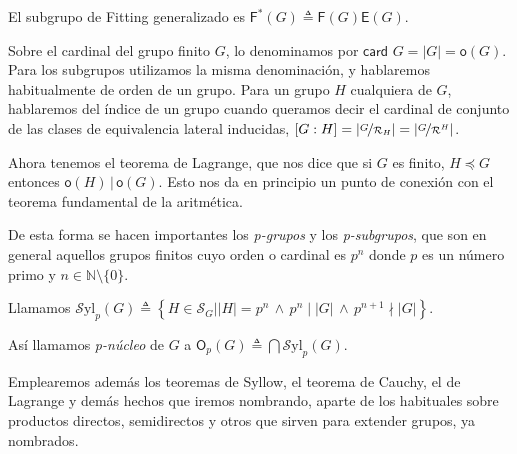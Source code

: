 \documentclass[12pt,a4paper,fleqn,spanish,final,openright]{extbook}
\theoremstyle{definition}
\theoremstyle{remark}
\theoremstyle{proof}
\begin{document}
El subgrupo de Fitting generalizado es $\mathsf{F}^{*}(G) \triangleq \mathsf{F}(G) \mathsf{E}(G)$.

Sobre el cardinal del grupo finito $G$, lo denominamos por $\textsf{card }G = \left| G \right| = \mathsf{o}(G)$. Para los subgrupos utilizamos la misma denominación, y hablaremos habitualmente de orden de un grupo. Para un grupo $H$ cualquiera de $G$, hablaremos del índice de un grupo cuando queramos decir el cardinal de conjunto de las clases de equivalencia lateral inducidas, $\left[ G : H \right] = \left| \nicefrac{G}{\mathcal{R}_H} \right| =\left| \nicefrac{G}{\mathcal{R}^H} \right| $.

Ahora tenemos el teorema de Lagrange, que nos dice que si $G$ es finito, $H\preccurlyeq G$ entonces ${\mathsf{o}(H)} \,\vert\, {{\mathsf{o}}(G)}$. Esto nos da en principio un punto de conexión con el teorema fundamental de la aritmética.

De esta forma se hacen importantes los \emph{p-grupos} y los \emph{p-subgrupos}, que son en general aquellos grupos finitos cuyo orden o cardinal es $p^n$ donde $p$ es un número primo y $n\in\mathds{N}\setminus\lbrace 0\rbrace$.

Llamamos ${\mathcal{S}\text{yl}}_{p}(G) \triangleq \left\lbrace H\in \mathcal{S}_{G} \vert \left| H \right|=p^n \, \wedge\, p^{n}\mid \left| G \right| \,\wedge\, p^{n+1}\nmid \left| G \right| \right\rbrace$.

Así llamamos \emph{p-núcleo} de $G$ a $\mathsf{O}_{p}(G) \triangleq \bigcap {\mathcal{S}\text{yl}}_{p}(G)$.

Emplearemos además los teoremas de Syllow, el teorema de Cauchy, el de Lagrange y demás hechos que iremos nombrando, aparte de los habituales sobre productos directos, semidirectos y otros que sirven para extender grupos, ya nombrados. 
\end{document}
